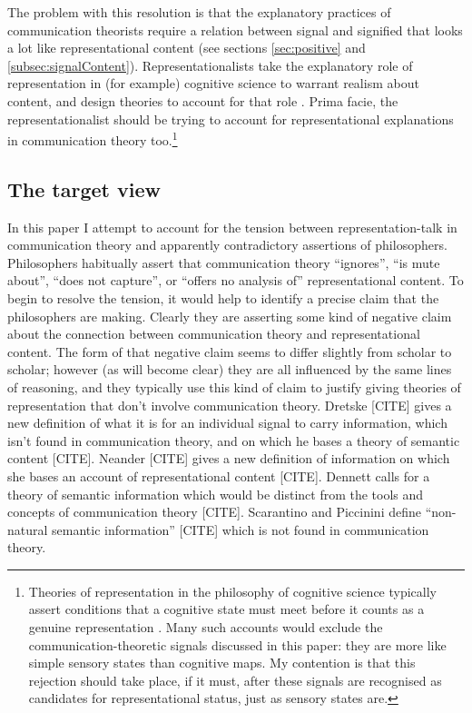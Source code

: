 \documentclass[12pt]{article}
\begin{document}
The problem with this resolution is that the explanatory practices of communication theorists require a relation between signal and signified that looks a lot like representational content (see sections \ref{sec:positive} and \ref{subsec:signalContent}).
Representationalists take the explanatory role of representation in (for example) cognitive science to warrant realism about content, and design theories to 
account for that role \citep{burge2010origins,shea2018representation}.
Prima facie, the representationalist should be trying to account for representational explanations in communication theory too.\footnote{Theories of representation in the philosophy of cognitive science typically assert conditions that a cognitive state must meet before it counts as a genuine representation \citep{shea2018representation,burge2010origins,piccinini2020nonnatural,desouzafilho2022dual}. Many such accounts would exclude the communication-theoretic signals discussed in this paper: they are more like simple sensory states than cognitive maps. My contention is that this rejection should take place, if it must, after these signals are recognised as candidates for representational status, just as sensory states are.}

\subsection{The target view}

In this paper I attempt to account for the tension between representation-talk in communication theory and apparently contradictory assertions of philosophers.
Philosophers habitually assert that communication theory ``ignores'', ``is mute about'', ``does not capture'', or ``offers no analysis of'' representational content.
To begin to resolve the tension, it would help to identify a precise claim that the philosophers are making.
Clearly they are asserting some kind of negative claim about the connection between communication theory and representational content.
The form of that negative claim seems to differ slightly from scholar to scholar; however (as will become clear) they are all influenced by the same lines of reasoning, and they typically use this kind of claim to justify giving theories of representation that don't involve communication theory.
Dretske [CITE] gives a new definition of what it is for an individual signal to carry information, which isn't found in communication theory, and on which he bases a theory of semantic content [CITE].
Neander [CITE] gives a new definition of information on which she bases an account of representational content [CITE].
Dennett calls for a theory of semantic information which would be distinct from the tools and concepts of communication theory [CITE].
Scarantino and Piccinini define ``non-natural semantic information'' [CITE] which is not found in communication theory.
\end{document}
